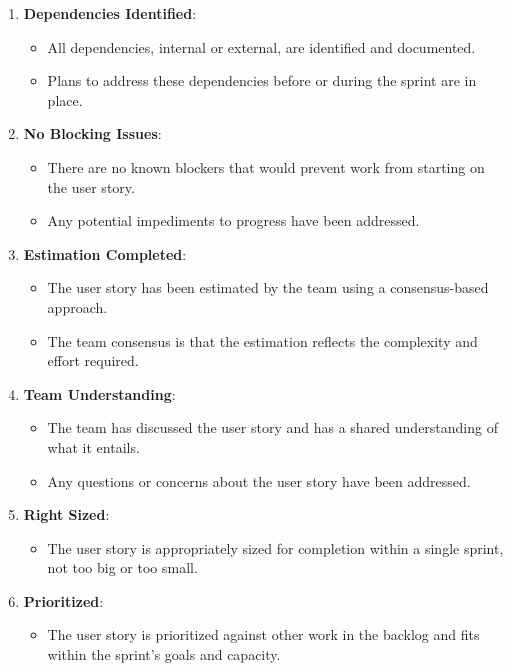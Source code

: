 \documentclass[11pt,a4paper]{article}
\begin{document}
\begin{enumerate}
        \item \textbf{Dependencies Identified}:
        \begin{itemize}
            \item All dependencies, internal or external, are identified and documented.
            \item Plans to address these dependencies before or during the sprint are in place.
        \end{itemize}

        \item \textbf{No Blocking Issues}:
        \begin{itemize}
            \item There are no known blockers that would prevent work from starting on the user story.
            \item Any potential impediments to progress have been addressed.
        \end{itemize}

        \item \textbf{Estimation Completed}:
        \begin{itemize}
            \item The user story has been estimated by the team using a consensus-based approach.
            \item The team consensus is that the estimation reflects the complexity and effort required.
        \end{itemize}

        \item \textbf{Team Understanding}:
        \begin{itemize}
            \item The team has discussed the user story and has a shared understanding of what it entails.
            \item Any questions or concerns about the user story have been addressed.
        \end{itemize}

        \item \textbf{Right Sized}:
        \begin{itemize}
            \item The user story is appropriately sized for completion within a single sprint, not too big or too small.
        \end{itemize}

        \item \textbf{Prioritized}:
        \begin{itemize}
            \item The user story is prioritized against other work in the backlog and fits within the sprint's goals and capacity.
        \end{itemize}


\end{enumerate}
\end{document}
